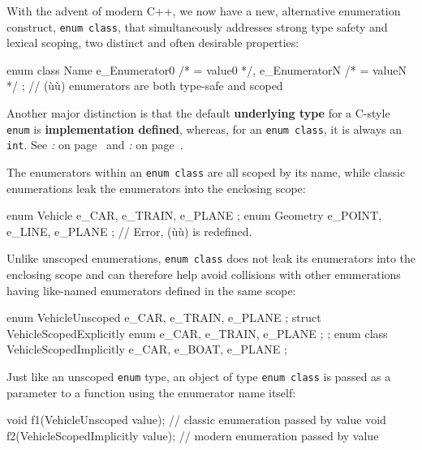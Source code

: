 With the advent of modern C++, we now have a new, alternative
enumeration construct, \texttt{enum}~\texttt{class}, that simultaneously
addresses strong type safety and lexical scoping, two distinct and often
desirable properties:

\begin{emcppslisting}
enum class Name { e_Enumerator0 /* = value0 */, e_EnumeratorN /* = valueN */ };
    // (ù{}ù) enumerators are both type-safe and scoped
\end{emcppslisting}

\noindent Another major distinction is that the default
\textbf{underlying type} for a C-style \texttt{enum} is
\textbf{implementation defined}, whereas, for an
\texttt{enum}~\texttt{class}, it is always an \texttt{int}. See
\textit{: } on page~\pageref{enum-class-and-underlying-type} and
\textit{: } on page~\pageref{external-use-of-opaque-enumerators-enumclass}.

The enumerators within an \texttt{enum}~\texttt{class} are all scoped by
its name, while classic enumerations leak the enumerators into the
enclosing scope:

\begin{emcppslisting}
enum Vehicle  { e_CAR,   e_TRAIN, e_PLANE };
enum Geometry { e_POINT, e_LINE,  e_PLANE };  // Error, (ù{}ù) is redefined.
\end{emcppslisting}

\noindent Unlike unscoped enumerations, \texttt{enum}~\texttt{class} does not leak
its enumerators into the enclosing scope and can therefore help avoid
collisions with other enumerations having like-named enumerators defined
in the same scope:

\begin{emcppslisting}
enum       VehicleUnscoped  { e_CAR, e_TRAIN, e_PLANE };
struct     VehicleScopedExplicitly { enum { e_CAR, e_TRAIN, e_PLANE }; };
enum class VehicleScopedImplicitly { e_CAR, e_BOAT,  e_PLANE };
\end{emcppslisting}

\noindent Just like an unscoped \texttt{enum} type, an object of type
\texttt{enum}~\texttt{class} is passed as a parameter to a function
using the enumerator name itself:

\begin{emcppslisting}
void f1(VehicleUnscoped value);          // classic enumeration passed by value
void f2(VehicleScopedImplicitly value);  // modern enumeration passed by value
\end{emcppslisting}

